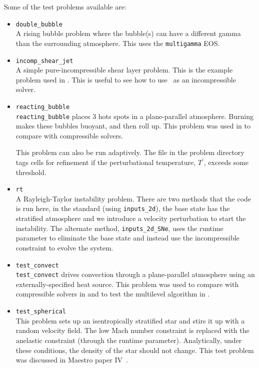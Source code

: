 Some of the test problems available are:
\begin{itemize}
\item {\tt double\_bubble} \\[-3mm]

A rising bubble problem where the bubble(s) can have a different gamma
than the surrounding atmosphere.  This uses the {\tt multigamma} EOS.

\item {\tt incomp\_shear\_jet} \\[-3mm]

A simple pure-incompressible shear layer problem.  This is the example
problem used in \cite{bellcolellaglaz}.  This is useful to see how to
use \maestro\ as an incompressible solver.

\item {\tt reacting\_bubble} \\[-3mm]

{\tt reacting\_bubble} places 3 hots spots in a plane-parallel atmosphere.
Burning makes these bubbles buoyant, and then roll up.  This problem was
used in \cite{lowMach3} to compare with compressible solvers.

This problem can also be run adaptively.  The 
file in the problem directory tags cells for refinement if the
perturbational temperature, $T^\prime$, exceeds some threshold.  

\item {\tt rt} \\ [-3mm]

A Rayleigh-Taylor instability problem.  There are two methods that the
code is run here, in the standard (using {\tt inputs\_2d}), the base state
has the stratified atmosphere and we introduce a velocity perturbation
to start the instability.  The alternate method, {\tt inputs\_2d\_SNe}, uses
the  runtime parameter to eliminate the base state
and instead use the incompressible constraint to evolve the system.

\item {\tt test\_convect} \\[-3mm]

{\tt test\_convect} drives convection through a plane-parallel
atmosphere using an externally-specified heat source.  This problem
was used to compare with compressible solvers in \cite{lowMach3}
and to test the multilevel algorithm in \cite{multilevel}.

\item {\tt test\_spherical} \\[-3mm]

This problem sets up an isentropically stratified star and stirs it up
with a random velocity field.  The low Mach number constraint is
replaced with the anelastic constraint (through
the  runtime parameter).  Analytically, under
these conditions, the density of the star should not change.  This
test problem was discussed in Maestro paper IV~\cite{lowMach4}.


\end{itemize}



